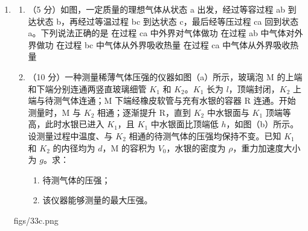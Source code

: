 \documentclass[\gkver]{gaokaozhenti}
\newcommand{\ccnum}[1]{{\fontspec{Noto Sans CJK JP}#1}}
\begin{document}
\begin{enumerate}
{联立以上各式，并代入数据得

$s_{0}=1.9\Um$\ccnum{⑰}。

（也可以如图的速度$-$时间图线求解。）

}

\item
\begin{enumerate}
	\item
	（5 分）如图，一定质量的理想气体从状态 a 出发，经过等容过程 ab 到达状态 b，再经过等温过程 bc 到达状态 c，最后经等压过程 ca 回到状态 a。下列说法正确的是
	{在过程 ca 中外界对气体做功}
	{在过程 ab 中气体对外界做功}
	{在过程 bc 中气体从外界吸收热量}
	{在过程 ca 中气体从外界吸收热量}
	\item
	（10 分）一种测量稀薄气体压强的仪器如图（a）所示，玻璃泡 M 的上端和下端分别连通两竖直玻璃细管 $K_{1}$ 和 $K_{2}$。$K_{1}$ 长为 $l$，顶端封闭，$K_{2}$ 上端与待测气体连通；M 下端经橡皮软管与充有水银的容器 R 连通。开始测量时，M 与 $K_{2}$ 相通；逐渐提升 R，直到 $K_{2}$ 中水银面与 $K_{1}$ 顶端等高，此时水银已进入 $K_{1}$，且 $K_{1}$ 中水银面比顶端低 $h$，如图（b）所示。设测量过程中温度、与 $K_{2}$ 相通的待测气体的压强均保持不变。已知 $K_{1}$ 和 $K_{2}$ 的内径均为 $d$，M 的容积为 $V_{0}$，水银的密度为 $\rho$，重力加速度大小为 $g$。求：
	\begin{enumerate}
		\item
		待测气体的压强；
		\item
		该仪器能够测量的最大压强。
	\end{enumerate}
\end{enumerate}
{figs/33c.png}

\end{enumerate}
\end{document}
